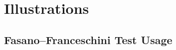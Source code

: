\documentclass[codesnippet]{jss}
\begin{document}


\section{Illustrations} \label{sec:illustrations}

\subsection{Fasano--Franceschini Test Usage}
\end{document}
